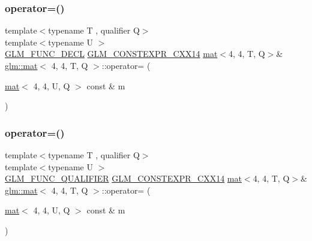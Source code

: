 \subsubsection{\texorpdfstring{operator=()}{operator=()}\hspace{0.1cm}{\footnotesize\ttfamily [2/3]}}
{\footnotesize\ttfamily template$<$typename T , qualifier Q$>$ \\
template$<$typename U $>$ \\
\hyperlink{setup_8hpp_ab2d052de21a70539923e9bcbf6e83a51}{G\+L\+M\+\_\+\+F\+U\+N\+C\+\_\+\+D\+E\+CL} \hyperlink{setup_8hpp_a4dd12abf5e1164bc57f3a34671d03844}{G\+L\+M\+\_\+\+C\+O\+N\+S\+T\+E\+X\+P\+R\+\_\+\+C\+X\+X14} \hyperlink{structglm_1_1mat}{mat}$<$4, 4, T, Q$>$\& \hyperlink{structglm_1_1mat}{glm\+::mat}$<$ 4, 4, T, Q $>$\+::operator= (\begin{DoxyParamCaption}\item[{\hyperlink{structglm_1_1mat}{mat}$<$ 4, 4, U, Q $>$ const \&}]{m }\end{DoxyParamCaption})}

\mbox{\label{structglm_1_1mat_3_014_00_014_00_01_t_00_01_q_01_4_a835f3a0f213fcc160f198bf98c9b5bf0}} 
\subsubsection{\texorpdfstring{operator=()}{operator=()}\hspace{0.1cm}{\footnotesize\ttfamily [3/3]}}
{\footnotesize\ttfamily template$<$typename T , qualifier Q$>$ \\
template$<$typename U $>$ \\
\hyperlink{setup_8hpp_a33fdea6f91c5f834105f7415e2a64407}{G\+L\+M\+\_\+\+F\+U\+N\+C\+\_\+\+Q\+U\+A\+L\+I\+F\+I\+ER} \hyperlink{setup_8hpp_a4dd12abf5e1164bc57f3a34671d03844}{G\+L\+M\+\_\+\+C\+O\+N\+S\+T\+E\+X\+P\+R\+\_\+\+C\+X\+X14} \hyperlink{structglm_1_1mat}{mat}$<$4, 4, T, Q$>$\& \hyperlink{structglm_1_1mat}{glm\+::mat}$<$ 4, 4, T, Q $>$\+::operator= (\begin{DoxyParamCaption}\item[{\hyperlink{structglm_1_1mat}{mat}$<$ 4, 4, U, Q $>$ const \&}]{m }\end{DoxyParamCaption})}



